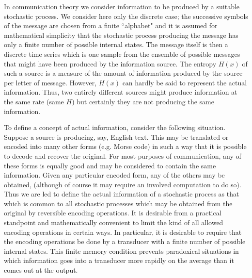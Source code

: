 \documentclass{article}[10pt, letter]
\begin{document}
In communication theory we consider information to be produced by a suitable stochastic process. We consider here only the discrete case; the
successive symbols of the message are chosen from a finite ``alphabet" and it is assumed for mathematical simplicity that the stochastic process producing
the message has only a finite number of possible internal states. The message itself is then a discrete time series which is one sample from the
ensemble of possible messages that might have been produced by the information source. The entropy $H(x)$ of such a source is a measure of the amount of
information produced by the source per letter of message. However, $H(x)$ can hardly be said to represent the actual information. Thus, two entirely
different sources might produce information at the same rate (same $H$) but certainly they are not producing the same information.

To define a concept of actual information, consider the following situation. Suppose a source is producing, say, English text. This may be translated or encoded into many other forms (e.g. Morse code) in such a way that it is possible to decode and recover the original. For most purposes of communication, any of these forms is equally good and may be considered to contain the same information. Given any particular encoded form, any of the others may be obtained, (although of course it may require an involved computation to do so). Thus we are led to define the actual information of a stochastic process as that which is common to all stochastic processes which may be obtained from the original by reversible encoding operations. It is desirable from a practical standpoint and mathematically convenient to limit the kind of all allowed encoding operations in certain ways. In particular, it is desirable to require that the encoding operations be done by a transducer with a finite number of possible internal states. This finite memory condition prevents paradoxical situations in which information goes into a transducer more rapidly on the average than it comes out at the output.
\end{document}
